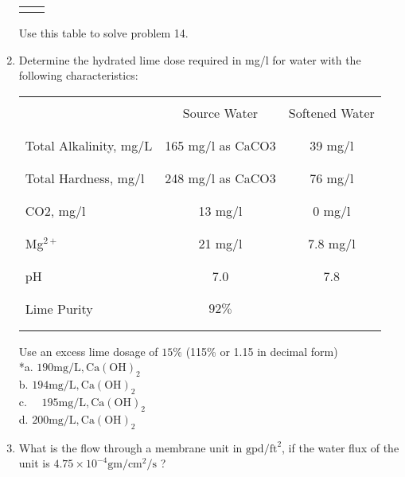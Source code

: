 \begin{enumerate}
\begin{center}
\begin{tabular}{|l|c|}
\hline\\
\end{tabular}
\end{center}
Use this table to solve problem 14.\\
\item Determine the hydrated lime dose required in mg/l for water with the following characteristics:\\
\begin{center}
\begin{tabular}{|l|c|c|}
\hline\\
 & Source Water & Softened Water \\\\
\hline\\
Total Alkalinity, mg/L & 165 mg/l as CaCO3 & 39 mg/l \\\\
\hline\\
Total Hardness, mg/l & 248 mg/l as CaCO3 & 76 mg/l \\\\
\hline\\
CO2, mg/l & 13 mg/l & 0 mg/l \\\\
\hline\\
{Mg}$^{2+}$ & 21 mg/l & 7.8 mg/l \\\\
\hline\\
pH & 7.0 & 7.8 \\\\
\hline\\
Lime Purity & $92 \%$ &  \\\\
\hline\\
\end{tabular}
\end{center}
Use an excess lime dosage of $15 \%$ (115\% or 1.15 in decimal form)\\
*a. $190 \mathrm{mg} / \mathrm{L}, \mathrm{Ca}(\mathrm{OH})_{2}$\\
b. $194 \mathrm{mg} / \mathrm{L}, \mathrm{Ca}(\mathrm{OH})_{2}$\\
c. $\quad 195 \mathrm{mg} / \mathrm{L}, \mathrm{Ca}(\mathrm{OH})_{2}$\\
d. $200 \mathrm{mg} / \mathrm{L}, \mathrm{Ca}(\mathrm{OH})_{2}$\\
\item What is the flow through a membrane unit in $\mathrm{gpd} / \mathrm{ft}^{2}$, if the water flux of the unit is $4.75 \times 10^{-4} \mathrm{gm} / \mathrm{cm}^{2} / \mathrm{s}$ ?\\

\end{enumerate}
